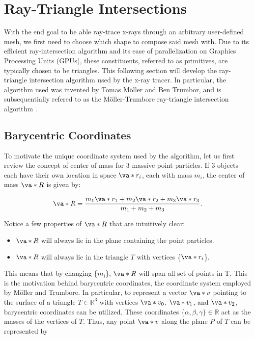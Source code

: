 \section{Ray-Triangle Intersections}
\par With the end goal to be able ray-trace x-rays through an arbitrary user-defined mesh, we first need to choose which shape to compose said mesh with. Due to its efficient ray-intersection algorithm and its ease of parallelization on Graphics Processing Units (GPUs), these constituents, referred to as primitives, are typically chosen to be triangles. This following section will develop the ray-triangle intersection algorithm used by the x-ray tracer. In particular, the algorithm used was invented by Tomas Möller and Ben Trumbor, and is subsequentially refered to as the Möller-Trumbore ray-triangle intersection algorithm \cite{moller2005fast}. 

\subsection{Barycentric Coordinates}
\par To motivate the unique coordinate system used by the algorithm, let us first review the concept of center of mass for 3 massive point particles. If 3 objects each have their own location in space $\va*{r_i}$, each with mass $m_i$, the center of mass $\va*{R}$ is given by:

\begin{equation}
  \va*{R} = \frac{m_1 \va*{r_1} + m_2 \va*{r_2} + m_3 \va*{r_3}}{m_1 + m_2 + m_3}.
  \label{eq:com}
\end{equation}

Notice a few properties of $\va*{R}$ that are intuitively clear:

\begin{itemize}
\item $\va*{R}$ will always lie in the plane containing the point particles.
\item $\va*{R}$ will always lie in the triangle $T$ with vertices \{$\va*{r_i}$\}.
\end{itemize}

\noindent This means that by changing \{$m_i$\}, $\va*{R}$ will span all set of points in T. This is the motivation behind barycentric coordinates, the coordinate system employed by Möller and Trumbore. In particular, to represent a vector $\va*{v}$ pointing to the surface of a triangle $T \in \mathbb{R}^3$ with vertices $\va*{v_0}$, $\va*{v_1}$, and $\va*{v_2}$, barycentric coordinates can be utilized. These coordinates \{$\alpha, \beta, \gamma\}\in \mathbb{R}$ act as the masses of the vertices of $T$. Thus, any point $\va*{v}$ along the plane $P$ of $T$ can be represented by 

